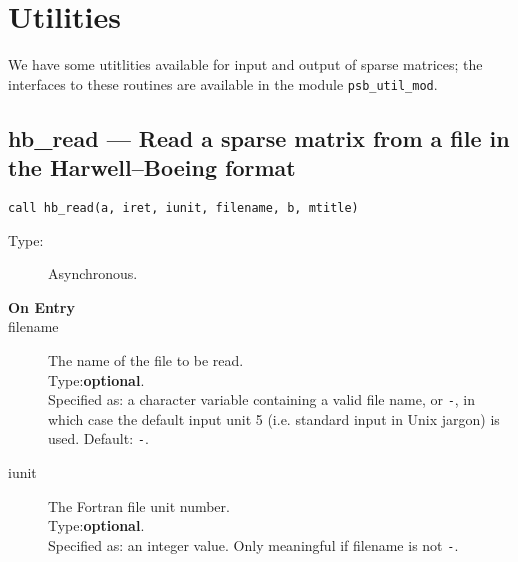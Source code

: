 \section{Utilities}
\label{sec:util}

We have some utitlities available for input and output of
sparse matrices; the interfaces to these routines are available in the
module \verb|psb_util_mod|.




\clearpage\subsection*{ hb\_read --- Read a sparse matrix from a file in the
  Harwell--Boeing format}


\begin{lstlisting}
call hb_read(a, iret, iunit, filename, b, mtitle)
\end{lstlisting}

\begin{description}
\item[Type:] Asynchronous.
\item[\bf  On Entry ]
\item[filename] The name of the file to be read.\\
Type:{\bf optional}.\\
Specified as: a character variable containing a valid file name, or
\verb|-|, in which case the default input unit  5 (i.e. standard input
in Unix jargon) is used. Default: \verb|-|. 
\item[iunit] The Fortran file unit number.\\
Type:{\bf optional}.\\
Specified as: an integer value. Only meaningful if filename is not \verb|-|.
\end{description}

